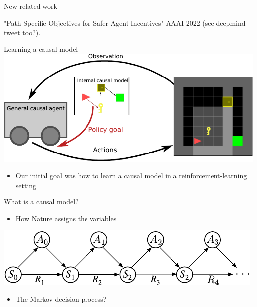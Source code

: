 
\begin{frame}{New related work}
    \item "Path-Specific Objectives for Safer Agent Incentives" AAAI 2022 (see deepmind tweet too?).
\end{frame}






\begin{frame}{Learning a causal model}
\includegraphics[width=\linewidth]{causal_figures/conceptA}
\begin{itemize}
\item Our initial goal was how to learn a causal model in a reinforcement-learning setting
\end{itemize}
\end{frame}

\begin{frame}{What is a causal model?}%
\begin{itemize}
\item How Nature assigns the variables \pause
\end{itemize}
\includegraphics[width=\linewidth]{causal_figures/sutton2018_79}
\begin{itemize} 
\item The Markov decision process? 
\end{itemize}
\end{frame}

